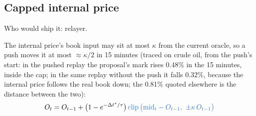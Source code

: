 \documentclass[10.5pt,a4paper]{article}
\newcommand{\chg}[1]{\ensuremath{{\color[HTML]{2F74D0}#1}}}
\newcommand{\clip}{\operatorname{clip}}
\begin{document}
\subsection{Capped internal price}
\par{\small\color{mute}Who would ship it: relayer.}\par
The internal price's book input may sit at most $\kappa$ from the current oracle, so a push moves it at most $\approx\kappa/2$ in 15 minutes (traced on crude oil, from the push's start: in the pushed replay the proposal's mark rises 0.48\% in the 15 minutes, inside the cap; in the same replay without the push it falls 0.32\%, because the internal price follows the real book down; the 0.81\% quoted elsewhere is the distance between the two):
\begin{equation}
O_t = O_{t-1} + \big(1 - e^{-\Delta t^*/\tau}\big)\,\chg{\clip\big(\text{mid}_t - O_{t-1},\ \pm\kappa\,O_{t-1}\big)}
\end{equation}
\end{document}
